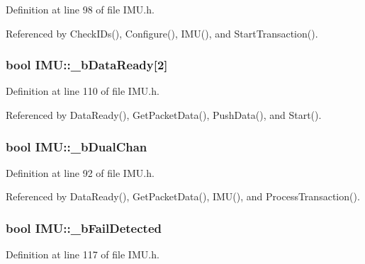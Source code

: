 Definition at line 98 of file IMU.h.



Referenced by CheckIDs(), Configure(), IMU(), and StartTransaction().

\hypertarget{class_i_m_u_a8a71f0728b2d849d1d8e54fcb58aad4e}{
\subsubsection[{\_\-bDataReady}]{\setlength{\rightskip}{0pt plus 5cm}bool {\bf IMU::\_\-bDataReady}\mbox{[}2\mbox{]}}}
\label{class_i_m_u_a8a71f0728b2d849d1d8e54fcb58aad4e}


Definition at line 110 of file IMU.h.



Referenced by DataReady(), GetPacketData(), PushData(), and Start().

\hypertarget{class_i_m_u_a62978e791838c3b4829e1d3d683e99b2}{
\subsubsection[{\_\-bDualChan}]{\setlength{\rightskip}{0pt plus 5cm}bool {\bf IMU::\_\-bDualChan}}}
\label{class_i_m_u_a62978e791838c3b4829e1d3d683e99b2}


Definition at line 92 of file IMU.h.



Referenced by DataReady(), GetPacketData(), IMU(), and ProcessTransaction().

\hypertarget{class_i_m_u_a12238a84e20f54c5fe799e0b37feb0ea}{
\subsubsection[{\_\-bFailDetected}]{\setlength{\rightskip}{0pt plus 5cm}bool {\bf IMU::\_\-bFailDetected}}}
\label{class_i_m_u_a12238a84e20f54c5fe799e0b37feb0ea}


Definition at line 117 of file IMU.h.



